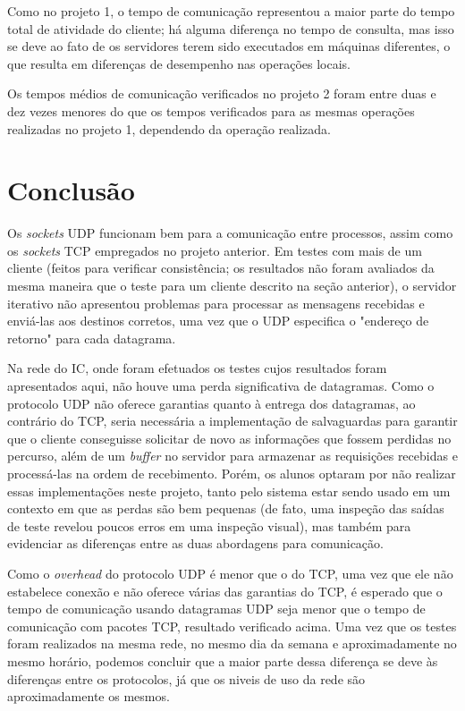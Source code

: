 \documentclass[11pt, brazil]{article} %
\begin{document}
Como no projeto 1, o tempo de comunicação representou a maior parte do tempo total de atividade do cliente; há alguma diferença no tempo de consulta, mas isso se deve ao fato de os servidores terem sido executados em máquinas diferentes, o que resulta em diferenças de desempenho nas operações locais.

Os tempos médios de comunicação verificados no projeto 2 foram entre duas e dez vezes menores do que os tempos verificados para as mesmas operações realizadas no projeto 1, dependendo da operação realizada.


\section{Conclusão}

Os \emph{sockets} UDP funcionam bem para a comunicação entre processos, assim como os \emph{sockets} TCP empregados no projeto anterior. 
Em testes com mais de um cliente (feitos para verificar consistência; os resultados não foram avaliados da mesma maneira que o teste para um cliente descrito na seção anterior), o servidor iterativo não apresentou problemas para processar as mensagens recebidas e enviá-las aos destinos corretos, uma vez que o UDP especifica o "endereço de retorno" para cada datagrama. 

Na rede do IC, onde foram efetuados os testes cujos resultados foram apresentados aqui, não houve uma perda significativa de datagramas. 
Como o protocolo UDP não oferece garantias quanto à entrega dos datagramas, ao contrário do TCP, seria necessária a implementação de salvaguardas para garantir que o cliente conseguisse solicitar de novo as informações que fossem perdidas no percurso, além de um \emph{buffer} no servidor para armazenar as requisições recebidas e processá-las na ordem de recebimento.
Porém, os alunos optaram por não realizar essas implementações neste projeto, tanto pelo sistema estar sendo usado em um contexto em que as perdas são bem pequenas (de fato, uma inspeção das saídas de teste revelou poucos erros em uma inspeção visual), mas também para evidenciar as diferenças entre as duas abordagens para comunicação.

Como o \emph{overhead} do protocolo UDP é menor que o do TCP, uma vez que ele não estabelece conexão e não oferece várias das garantias do TCP, é esperado que o tempo de comunicação usando datagramas UDP seja menor que o tempo de comunicação com pacotes TCP, resultado verificado acima. 
Uma vez que os testes foram realizados na mesma rede, no mesmo dia da semana e aproximadamente no mesmo horário, podemos concluir que a maior parte dessa diferença se deve às diferenças entre os protocolos, já que os niveis de uso da rede são aproximadamente os mesmos.
\end{document}
